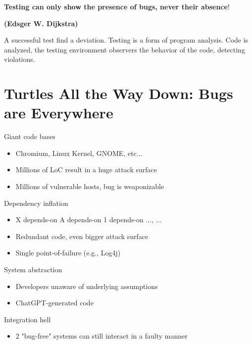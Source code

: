 \documentclass[11pt]{article}
\begin{document}
\textbf{Testing can only show the presence of bugs, never their absence}!

\begin{tcolorbox}[
  colback=gray!15,     %
  colframe=black!50,    %
  boxrule=1pt,       %
  arc=3mm,             %
  left=4mm, right=4mm, top=2mm, bottom=2mm %
]
\textbf{(Edsger W. Dijkstra)}

\vspace{0.3cm}

A successful test find a deviation. Testing is a form of program analysis. Code is analyzed, the testing environment observers the behavior of the code, detecting violations. 

\end{tcolorbox}

\section*{Turtles All the Way Down: Bugs are Everywhere}

Giant code bases
\begin{itemize}
	\item Chromium, Linux Kernel, GNOME, etc...
	\item Millions of LoC result in a huge attack surface
	\item Millions of vulnerable hosts, bug is weaponizable 
\end{itemize}

Dependency inflation
\begin{itemize}
	\item X depends-on {A depends-on {1 depends-on ...}, ...}
	\item Redundant code, even bigger attack surface
	\item Single point-of-failure (e.g., Log4j)
\end{itemize}

System abstraction
\begin{itemize}
	\item Developers unaware of underlying assumptions
	\item ChatGPT-generated code
\end{itemize}

Integration hell
\begin{itemize}
	\item 2 "bug-free" systems can still interact in a faulty manner
\end{itemize}
\end{document}
